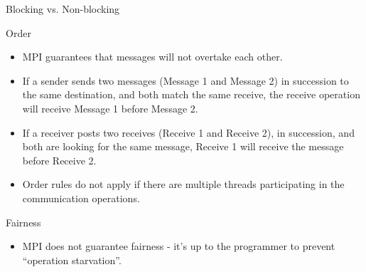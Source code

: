 \documentclass[10pt,t]{beamer}
\begin{document}
\begin{frame}[allowframebreaks]{Blocking vs. Non-blocking}
  \begin{block}{Order}
    \begin{itemize}
      \item MPI guarantees that messages will not overtake each other.
      \item If a sender sends two messages (Message 1 and Message 2) in succession to the same destination, and both match the same receive, the receive operation will receive Message 1 before Message 2.
      \item If a receiver posts two receives (Receive 1 and Receive 2), in succession, and both are looking for the same message, Receive 1 will receive the message before Receive 2.
      \item Order rules do not apply if there are multiple threads participating in the communication operations.
    \end{itemize}
  \end{block}
  \begin{block}{Fairness}
    \begin{itemize}
      \item MPI does not guarantee fairness - it’s up to the programmer to prevent “operation starvation”.
    \end{itemize}
  \end{block}
\end{frame}
\end{document}
